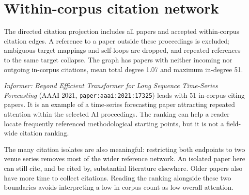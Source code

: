 \section{Within-corpus citation network}
The directed citation projection includes all \Papers{} papers and
\CitationEdges{} accepted within-corpus citation edges. A reference to a paper
outside these proceedings is excluded; ambiguous target mappings and self-loops
are dropped, and repeated references to the same target collapse. The graph
has \CitationIsolates{} papers with neither incoming nor outgoing in-corpus
citations, mean total degree 1.07 and maximum in-degree 51.

\FloatBarrier

\emph{Informer: Beyond Efficient Transformer for Long Sequence Time-Series
Forecasting} (AAAI 2021, \texttt{paper:aaai:2021:17325}) leads with 51 in-corpus
citing papers. It is an example of a time-series forecasting paper attracting
repeated attention within the selected AI proceedings. The ranking can help a
reader locate frequently referenced methodological starting points, but it is
not a field-wide citation ranking.

The many citation isolates are also meaningful: restricting both endpoints to
two venue series removes most of the wider reference network. An isolated paper
here can still cite, and be cited by, substantial literature elsewhere. Older
papers also have more time to collect citations. Reading the ranking alongside
these two boundaries avoids interpreting a low in-corpus count as low overall
attention.

